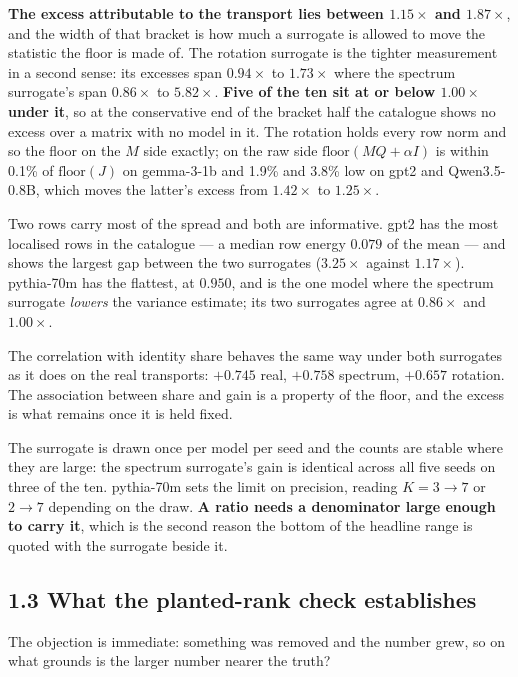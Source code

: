 \documentclass[10pt,letterpaper,twocolumn]{article}
\begin{document}
\textbf{The excess attributable to the transport lies between \(1.15\times\) and \(1.87\times\)}, and the
width of that bracket is how much a surrogate is allowed to move the statistic the floor is made
of. The rotation surrogate is the tighter measurement in a second sense: its excesses span
\(0.94\times\) to \(1.73\times\) where the spectrum surrogate's span \(0.86\times\) to \(5.82\times\). \textbf{Five of
the ten sit at or below \(1.00\times\) under it}, so at the conservative end of the bracket half the
catalogue shows no excess over a matrix with no model in it. The rotation holds every row norm and
so the floor on the \(M\) side exactly; on the raw side \(\text{floor}(MQ+\alpha I)\) is within 0.1\% of
\(\text{floor}(J)\) on gemma-3-1b and 1.9\% and 3.8\% low on gpt2 and Qwen3.5-0.8B, which moves the
latter's excess from \(1.42\times\) to \(1.25\times\).

Two rows carry most of the spread and both are informative. gpt2 has the most localised rows in the
catalogue --- a median row energy \(0.079\) of the mean --- and shows the largest gap between the two
surrogates (\(3.25\times\) against \(1.17\times\)). pythia-70m has the flattest, at \(0.950\), and is the
one model where the spectrum surrogate \emph{lowers} the variance estimate; its two surrogates agree at
\(0.86\times\) and \(1.00\times\).

The correlation with identity share behaves the same way under both surrogates as it does on the
real transports: \(+0.745\) real, \(+0.758\) spectrum, \(+0.657\) rotation. The association between share
and gain is a property of the floor, and the excess is what remains once it is held fixed.

The surrogate is drawn once per model per seed and the counts are stable where they are large: the
spectrum surrogate's gain is identical across all five seeds on three of the ten. pythia-70m sets
the limit on
precision, reading \(K=3\to7\) or \(2\to7\) depending on the draw. \textbf{A ratio needs a denominator large
enough to carry it}, which is the second reason the bottom of the headline range is quoted with
the surrogate beside it.

\subsection{1.3 What the planted-rank check establishes}\label{13-what-the-planted-rank-check-establishes}

The objection is immediate: something was removed and the number grew, so on what grounds is the
larger number nearer the truth?
\end{document}
